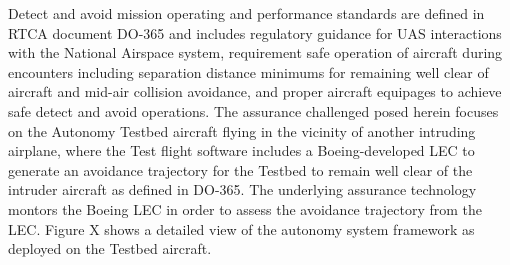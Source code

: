 Detect and avoid mission operating and performance standards are defined in RTCA document DO-365 and includes regulatory guidance for UAS interactions with the National Airspace system, requirement safe operation of aircraft during encounters including separation distance minimums for remaining well clear of aircraft and mid-air collision avoidance, and proper aircraft equipages to achieve safe detect and avoid operations.
The assurance challenged posed herein focuses on the Autonomy Testbed aircraft flying in the vicinity of another intruding airplane, where the Test flight software includes a Boeing-developed LEC to generate an avoidance trajectory for the Testbed to remain well clear of the intruder aircraft as defined in DO-365.  The underlying assurance technology montors the Boeing LEC in order to assess the avoidance trajectory from the LEC.
Figure X shows a detailed view of the autonomy system framework as deployed on the Testbed aircraft.

